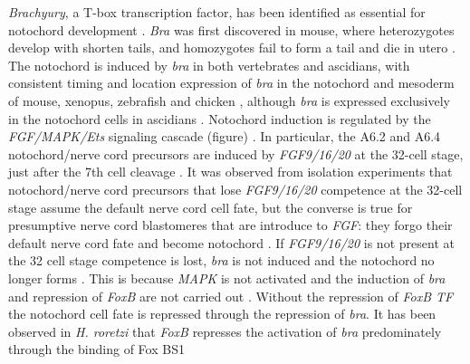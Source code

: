 \textit{Brachyury}, a T-box transcription factor, has been identified as essential for notochord development \cite{yasuo_conservation_1998}. \textit{Bra} was first discovered in mouse, where heterozygotes develop with shorten tails, and homozygotes fail to form a tail and die in utero \cite{herrmann_t_1994}. The notochord is induced by {\em bra} in both vertebrates and ascidians, with consistent timing and location expression of \textit{bra} in the notochord and mesoderm of mouse, xenopus, zebrafish and chicken \cite{kavka_tales_1997}, although {\em bra} is expressed exclusively in the notochord cells in ascidians \cite{yasuo_ascidian_1994}. Notochord induction is regulated by the \textit{FGF/MAPK/Ets} signaling cascade (figure) \cite{minokawa_binary_2001}. In particular, the A6.2 and A6.4 notochord/nerve cord precursors are induced by \textit{FGF9/16/20} at the 32-cell stage, just after the 7th cell cleavage \cite{satoh_ascidian_2001}. It was observed from isolation experiments that notochord/nerve cord precursors that lose \textit{FGF9/16/20} competence at the 32-cell stage assume the default nerve cord cell fate, but the converse is true for presumptive nerve cord blastomeres that are introduce to \textit{FGF}: they forgo their default nerve cord fate and become notochord \cite{yasuo_conservation_1998,minokawa_binary_2001}. If \textit{FGF9/16/20} is not present at the 32 cell stage competence is lost, \textit{bra} is not induced and the notochord no longer forms \cite{nakatani_basic_1996,nakatani_duration_1999}. This is because \textit{MAPK} is not activated and the induction of \textit{bra} and repression of \textit{FoxB} are not carried out \cite{hashimoto_transcription_2011}. Without the repression of \textit{FoxB TF} the notochord cell fate is repressed through the repression of \textit{bra}. It has been observed in \textit{H. roretzi} that \textit{FoxB} represses the activation of \textit{bra} predominately through the binding of Fox BS1%
